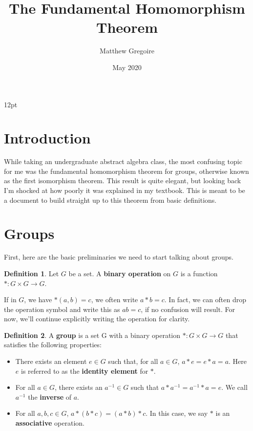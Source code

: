\documentclass{article}
\title{The Fundamental Homomorphism Theorem}
\author{Matthew Gregoire}
\date{May 2020}
\newcommand{\inv}[1]{#1^{-1}}
\theoremstyle{definition}
\newtheorem{definition}{Definition}[section]
\newenvironment{defn}
{\theoremstyle{definition}
\begin{definition}{}}
{\end{definition}}
\begin{document}
{12pt}

\maketitle

\tableofcontents

\pagebreak

\section{Introduction}

While taking an undergraduate abstract algebra class, the most confusing topic for me was the fundamental homomorphism theorem for groups, otherwise known as the first isomorphism theorem. This result is quite elegant, but looking back I'm shocked at how poorly it was explained in my textbook. This is meant to be a document to build straight up to this theorem from basic definitions.

\section{Groups}

First, here are the basic preliminaries we need to start talking about groups.

\begin{defn}
Let $G$ be a set. A \textbf{binary operation} on $G$ is a function $*: G \times G \to G$.
\end{defn}

If in $G$, we have $*(a, b) = c$, we often write $a * b = c$. In fact, we can often drop the operation symbol and write this as $ab = c$, if no confusion will result. For now, we'll continue explicitly writing the operation for clarity.


\begin{defn}
A \textbf{group} is a set G with a binary operation $*: G \times G \to G$ that satisfies the following properties:
\begin{itemize}
    \item There exists an element $e \in G$ such that, for all $a \in G$, $a*e = e*a = a$. Here $e$ is referred to as the \textbf{identity element} for $*$.
    \item For all $a \in G$, there exists an $\inv{a} \in G$ such that $a*\inv{a} = \inv{a}*a = e$. We call $\inv{a}$ the \textbf{inverse} of $a$.
    \item For all $a, b, c \in G$, $a * (b * c) = (a * b) * c$. In this case, we say $*$ is an \textbf{associative} operation.
\end{itemize}
\end{defn}
\end{document}
